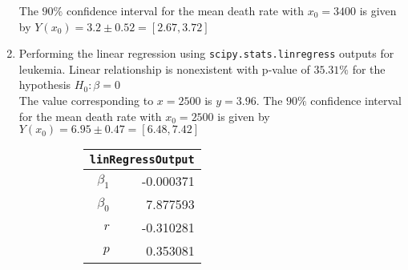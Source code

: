 \begin{enumerate}
\begin{figure}[H]
\begin{subfigure}[]{0.2\linewidth}
	\end{subfigure}
	\begin{subfigure}[]{0.8\linewidth}
		\centering
		
	\end{subfigure}
\end{figure}

The $ 90\% $ confidence interval for the mean death rate with $ x_0 = 3400 $ is given by
$ Y(x_0) = 3.2 \pm 0.52 = [2.67, 3.72] $\\


\item Performing the linear regression using \texttt{scipy.stats.linregress} outputs for leukemia.
Linear relationship is nonexistent with p-value of $ 35.31\% $ for the hypothesis $ H_0 : \beta = 0 $\\
The value corresponding to $ x = 2500 $ is $ y = 3.96 $.
The $ 90\% $ confidence interval for the mean death rate with $ x_0 = 2500 $ is given by
$ Y(x_0) = 6.95 \pm 0.47 = [6.48, 7.42] $\\

\begin{figure}[H]
	\begin{subfigure}[]{0.2\linewidth}
		\centering
		\begin{tabular}{@{}rr@{}}
			\toprule
			\multicolumn{2}{c}{\texttt{linRegressOutput}} \\
			\midrule
			$\beta_1$     &        -0.000371 \\
			$\beta_0$ &         7.877593 \\
			$r$    &        -0.310281 \\
			$p$    &         0.353081 \\
			\bottomrule
		\end{tabular}
		

\end{subfigure}
\end{figure}
\end{enumerate}
